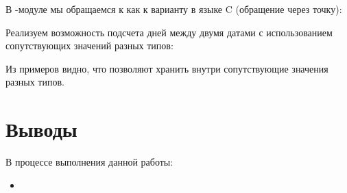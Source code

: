 

В -модуле мы обращаемся к  как к варианту  в языке C (обращение через точку):


Реализуем возможность подсчета дней между двумя датами с использованием сопутствующих значений разных типов:



Из примеров видно, что  позволяют хранить внутри сопутствующие значения разных типов.

\section{Выводы}

В процессе выполнения данной работы:

\begin{itemize}
	\item 
\end{itemize}


